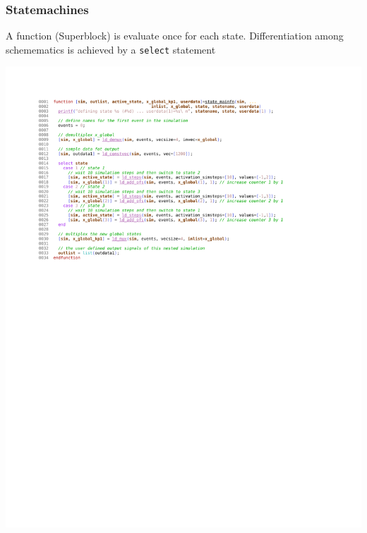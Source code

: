 \documentclass[serif,9pt,xcolor=dvipsnames]{beamer}
\begin{document}
\begin{frame}
  \frametitle{Statemachines}

A function (Superblock) is evaluate once for each state. Differentiation among schemematics is achieved by a \texttt{select} statement
  

\centering \includegraphics[trim=2.7cm 9.5cm 4cm 1.4cm, clip, width=1.0\linewidth]{figures/state_mainfn.pdf} 

\end{frame}
\end{document}
